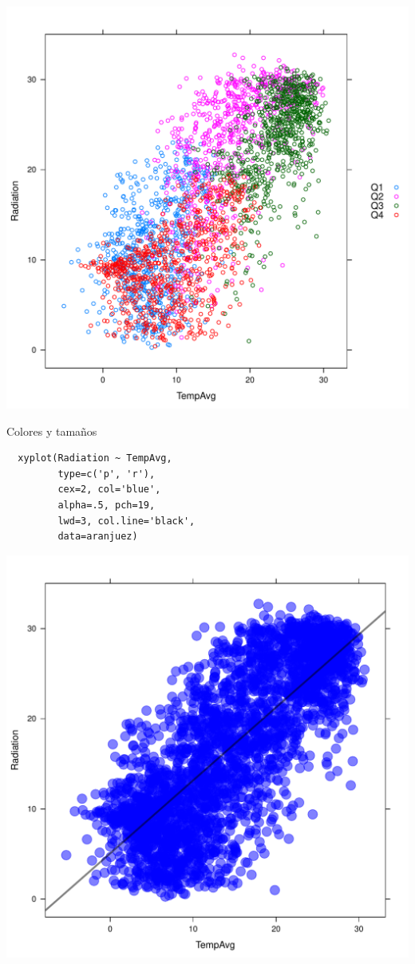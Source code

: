 \documentclass[xcolor={usenames,svgnames,dvipsnames}]{beamer}
\begin{document}
\begin{frame}[label=sec-6-1-11]{}
\includegraphics[width=.9\linewidth]{figs/xyplotQuarter.pdf}
\end{frame}

\begin{frame}[fragile,label=sec-6-1-12]{Colores y tamaños}
 \lstset{language=R,label= ,caption= ,numbers=none}
\begin{lstlisting}
  xyplot(Radiation ~ TempAvg,
         type=c('p', 'r'),
         cex=2, col='blue',
         alpha=.5, pch=19,
         lwd=3, col.line='black',
         data=aranjuez)
\end{lstlisting}
\end{frame}

\begin{frame}[label=sec-6-1-13]{}
\includegraphics[width=.9\linewidth]{figs/xyplotColors.pdf}
\end{frame}
\end{document}
